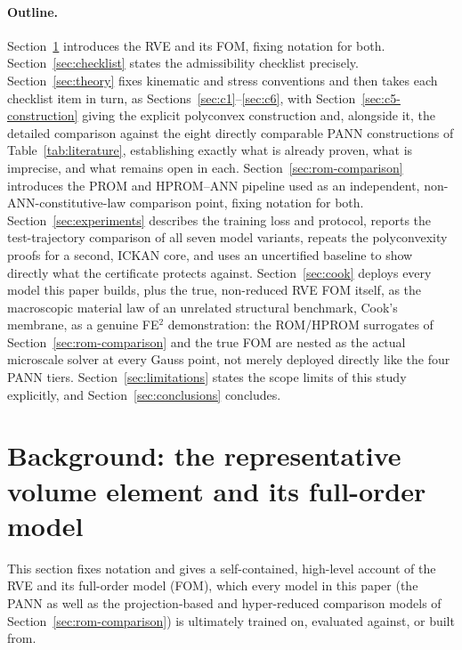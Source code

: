 \documentclass[10pt,a4paper]{article}
\begin{document}
\paragraph{Outline.} Section~\ref{sec:background} introduces the RVE
and its FOM, fixing notation for both. Section~\ref{sec:checklist} states the admissibility
checklist precisely. Section~\ref{sec:theory} fixes kinematic and stress
conventions and then takes each checklist item in turn, as
Sections~\ref{sec:c1}--\ref{sec:c6}, with Section~\ref{sec:c5-construction}
giving the explicit polyconvex construction and, alongside it, the
detailed comparison against the eight directly comparable PANN
constructions of Table~\ref{tab:literature}, establishing exactly what is
already proven, what is imprecise, and what remains open in each.
Section~\ref{sec:rom-comparison}
introduces the PROM and HPROM--ANN pipeline used as an independent,
non-ANN-constitutive-law comparison point, fixing notation for both.
Section~\ref{sec:experiments}
describes the training loss and protocol, reports the test-trajectory comparison of all seven model variants, repeats the
polyconvexity proofs for a second, ICKAN core, and uses an uncertified
baseline to show directly what the certificate protects against.
Section~\ref{sec:cook} deploys every model this paper builds, plus the
true, non-reduced RVE FOM itself, as the macroscopic material law of an
unrelated structural benchmark, Cook's membrane, as a genuine FE$^2$
demonstration: the ROM/HPROM surrogates of Section~\ref{sec:rom-comparison}
and the true FOM are nested as the actual microscale solver at every
Gauss point, not merely deployed directly like the four PANN tiers.
Section~\ref{sec:limitations}
states the scope limits of this study explicitly, and
Section~\ref{sec:conclusions} concludes.

\section{Background: the representative volume element and its full-order model}
\label{sec:background}
This section fixes notation and gives a self-contained, high-level account
of the RVE and its full-order model (FOM),
which every model in this paper (the PANN as well as the projection-based
and hyper-reduced comparison models of Section~\ref{sec:rom-comparison})
is ultimately trained on, evaluated against, or built from.
\end{document}
